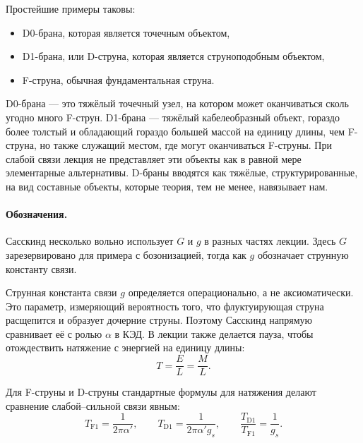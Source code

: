 Простейшие примеры таковы:
\begin{itemize}
\item D0-брана, которая является точечным объектом,
\item D1-брана, или D-струна, которая является струноподобным объектом,
\item F-струна, обычная фундаментальная струна.
\end{itemize}
D0-брана — это тяжёлый точечный узел, на котором может оканчиваться сколь угодно много F-струн. D1-брана — тяжёлый кабелеобразный объект, гораздо более толстый и обладающий гораздо большей массой на единицу длины, чем F-струна, но также служащий местом, где могут оканчиваться F-струны. При слабой связи лекция не представляет эти объекты как в равной мере элементарные альтернативы. D-браны вводятся как тяжёлые, структурированные, на вид составные объекты, которые теория, тем не менее, навязывает нам.


\paragraph{Обозначения.}
Сасскинд несколько вольно использует \(G\) и \(g\) в разных частях лекции. Здесь \(G\) зарезервировано для примера с бозонизацией, тогда как \(g\) обозначает струнную константу связи.

Струнная константа связи \(g\) определяется операционально, а не аксиоматически. Это параметр, измеряющий вероятность того, что флуктуирующая струна расщепится и образует дочерние струны. Поэтому Сасскинд напрямую сравнивает её с ролью \(\alpha\) в КЭД. В лекции также делается пауза, чтобы отождествить натяжение с энергией на единицу длины:
\begin{equation}
T=\frac{E}{L}=\frac{M}{L}.
\end{equation}

Для F-струны и D-струны стандартные формулы для натяжения делают сравнение слабой--сильной связи явным:
\begin{equation}
T_{\mathrm{F1}}=\frac{1}{2\pi\alpha'},
\qquad
T_{\mathrm{D1}}=\frac{1}{2\pi\alpha' g_s},
\qquad
\frac{T_{\mathrm{D1}}}{T_{\mathrm{F1}}}=\frac{1}{g_s}.
\end{equation}

